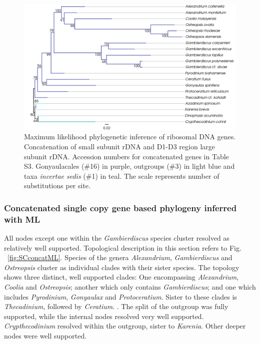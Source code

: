 \documentclass[12pt]{article}
\begin{document}
\begin{figure} 
\includegraphics[scale=.4]{figures/rDNA-ML.png} 
\caption{Maximum likelihood phylogenetic inference of ribosomal DNA genes. Concatenation of small subunit rDNA and D1-D3 region large subunit rDNA. Accession numbers for concatenated genes in Table S3. Gonyaulacales (\#16) in purple, outgroups (\#3) in light blue and taxa \textit{incertae sedis} (\#1) in teal. The scale represents number of substitutions per site.} 
\label{fig:rdna}
\end{figure} 
\FloatBarrier

\subsubsection*{Concatenated single copy gene based phylogeny inferred with ML}
\FloatBarrier
All nodes except one within the \emph{Gambierdiscus} species cluster resolved as relatively well supported. 
Topological description in this section refers to Fig. ~\ref{fig:SCconcatML}. 
Species of the genera \emph{Alexandrium}, \emph{Gambierdiscus} and \emph{Ostreopsis} cluster as individual clades with their sister species.  
The topology shows three distinct, well supported clades: 
One encompassing \emph{Alexandrium}, \emph{Coolia} and \emph{Ostreopsis}; another which only contains \emph{Gambierdiscus}; and one which includes \emph{Pyrodinium}, \emph{Gonyaulax} and \emph{Protoceratium}. 
Sister to these clades is \emph{Thecadinium}, followed by \emph{Ceratium}. .
The split of the outgroup was fully supported, while the internal nodes resolved very well supported. 
\emph{Crypthecodinium} resolved within the outgroup, sister to \emph{Karenia}. 
Other deeper nodes were well supported.
 
\end{document}
